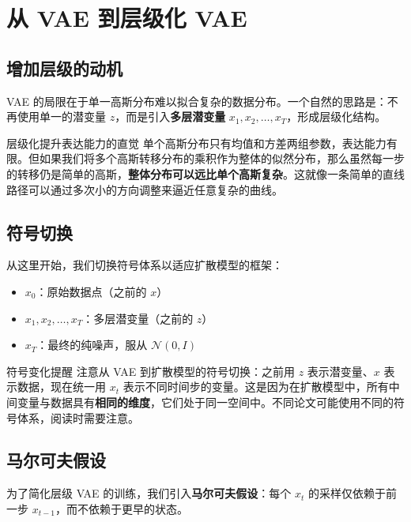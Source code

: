 \section{从 VAE 到层级化 VAE}

\subsection{增加层级的动机}

VAE 的局限在于单一高斯分布难以拟合复杂的数据分布。一个自然的思路是：不再使用单一的潜变量 $z$，而是引入\textbf{多层潜变量} $x_1, x_2, \ldots, x_T$，形成层级化结构。

\begin{knowledgebox}{层级化提升表达能力的直觉}
单个高斯分布只有均值和方差两组参数，表达能力有限。但如果我们将多个高斯转移分布的乘积作为整体的似然分布，那么虽然每一步的转移仍是简单的高斯，\textbf{整体分布可以远比单个高斯复杂}。这就像一条简单的直线路径可以通过多次小的方向调整来逼近任意复杂的曲线。
\end{knowledgebox}

\subsection{符号切换}

从这里开始，我们切换符号体系以适应扩散模型的框架：

\begin{itemize}
    \item $x_0$：原始数据点（之前的 $x$）
    \item $x_1, x_2, \ldots, x_T$：多层潜变量（之前的 $z$）
    \item $x_T$：最终的纯噪声，服从 $\mathcal{N}(0, I)$
\end{itemize}

\begin{warningbox}{符号变化提醒}
注意从 VAE 到扩散模型的符号切换：之前用 $z$ 表示潜变量、$x$ 表示数据，现在统一用 $x_t$ 表示不同时间步的变量。这是因为在扩散模型中，所有中间变量与数据具有\textbf{相同的维度}，它们处于同一空间中。不同论文可能使用不同的符号体系，阅读时需要注意。
\end{warningbox}

\subsection{马尔可夫假设}

为了简化层级 VAE 的训练，我们引入\textbf{马尔可夫假设}：每个 $x_t$ 的采样仅依赖于前一步 $x_{t-1}$，而不依赖于更早的状态。

